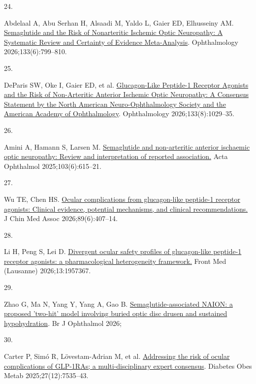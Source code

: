 \documentclass[
  11pt,
]{article}
\newlength{\cslhangindent}
\newlength{\csllabelwidth}
\newenvironment{CSLReferences}[2] %
 {\begin{list}{}{%
  \setlength{\itemindent}{0pt}
  \setlength{\leftmargin}{0pt}
  \setlength{\parsep}{0pt}
  \ifodd #1
   \setlength{\leftmargin}{\cslhangindent}
   \setlength{\itemindent}{-1\cslhangindent}
  \fi
  \setlength{\itemsep}{#2\baselineskip}}}
 {\end{list}}
\newcommand{\CSLLeftMargin}[1]{\parbox[t]{\csllabelwidth}{\strut#1\strut}}
\newcommand{\CSLRightInline}[1]{\parbox[t]{\linewidth - \csllabelwidth}{\strut#1\strut}}
\begin{document}
\begin{CSLReferences}{0}{1}
\CSLLeftMargin{24. }%
\CSLRightInline{Abdelaal A, Abu Serhan H, Alsaadi M, Yaldo L, Gaier ED,
Elhusseiny AM.
\href{https://doi.org/10.1016/j.ophtha.2026.02.013}{{Semaglutide and the
Risk of Nonarteritic Ischemic Optic Neuropathy: A Systematic Review and
Certainty of Evidence Meta-Analysis}}. Ophthalmology
2026;133(6):799--810. }

\CSLLeftMargin{25. }%
\CSLRightInline{DeParis SW, Oke I, Gaier ED, et al.
\href{https://doi.org/10.1016/j.ophtha.2026.04.008}{{Glucagon-Like
Peptide-1 Receptor Agonists and the Risk of Non-Arteritic Anterior
Ischemic Optic Neuropathy: A Consensus Statement by the North American
Neuro-Ophthalmology Society and the American Academy of Ophthalmology}}.
Ophthalmology 2026;133(8):1029--35. }

\CSLLeftMargin{26. }%
\CSLRightInline{Amini A, Hamann S, Larsen M.
\href{https://doi.org/10.1111/aos.17473}{{Semaglutide and non-arteritic
anterior ischaemic optic neuropathy: Review and interpretation of
reported association.}} Acta Ophthalmol 2025;103(6):615--21. }

\CSLLeftMargin{27. }%
\CSLRightInline{Wu TE, Chen HS.
\href{https://doi.org/10.1097/JCMA.0000000000001370}{{Ocular
complications from glucagon-like peptide-1 receptor agonists: Clinical
evidence, potential mechanisms, and clinical recommendations.}} J Chin
Med Assoc 2026;89(6):407--14. }

\CSLLeftMargin{28. }%
\CSLRightInline{Li H, Peng S, Lei D.
\href{https://doi.org/10.3389/fmed.2026.1957367}{{Divergent ocular
safety profiles of glucagon-like peptide-1 receptor agonists: a
pharmacological heterogeneity framework.}} Front Med (Lausanne)
2026;13:1957367. }

\CSLLeftMargin{29. }%
\CSLRightInline{Zhao G, Ma N, Yang Y, Yang A, Gao B.
\href{https://doi.org/10.1136/bjo-2026-329598}{{Semaglutide-associated
NAION: a proposed 'two-hit' model involving buried optic disc drusen and
sustained hypohydration}}. Br J Ophthalmol 2026;}

\CSLLeftMargin{30. }%
\CSLRightInline{Carter P, Simó R, Lövestam-Adrian M, et al.
\href{https://doi.org/10.1111/dom.70160}{{Addressing the risk of ocular
complications of GLP-1RAs; a multi-disciplinary expert consensus}}.
Diabetes Obes Metab 2025;27(12):7535--43. }


\end{CSLReferences}
\end{document}
